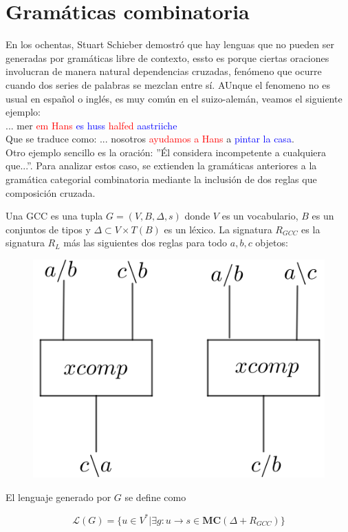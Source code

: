 \documentclass[../main.tex]{subfiles}
\begin{document}
	\section{Gramáticas combinatoria}
	
	En los ochentas, Stuart Schieber demostró que hay lenguas que no pueden ser generadas por gramáticas libre de contexto, essto es porque ciertas oraciones involucran de manera natural dependencias cruzadas, fenómeno que ocurre cuando dos series de palabras se mezclan entre sí. AUnque el fenomeno no es usual en español o inglés, es muy común en el suizo-alemán, veamos el siguiente ejemplo:\\
	... mer \textcolor{red}{em Hans} \textcolor{blue}{es huss} \textcolor{red}{halfed} \textcolor{blue}{aastriiche}\\
	Que se traduce como: ... nosotros \textcolor{red}{ayudamos a Hans} a \textcolor{blue}{pintar la casa}.\\
	Otro ejemplo sencillo es la oración: ''Él considera incompetente a cualquiera que...''.
	Para analizar estos caso, se extienden la gramáticas anteriores a la gramática categorial combinatoria mediante la inclusión de dos reglas que composición cruzada.
	
	\begin{dfn}
		Una GCC es una tupla $G=(V,B, \Delta, s)$ donde $V$ es un vocabulario, $B$ es un conjuntos de tipos y $\Delta \subset V \times T(B)$ es un léxico. La signatura $R_{GCC}$ es la signatura $R_{L}$ más las siguientes dos reglas para todo $a,b,c$ objetos:
		\begin{figure}[H]
			\includegraphics[scale=18]{diagrama/CCG.png}
			\centering
		\end{figure}
		El lenguaje generado por $G$ se define como
		
		$$\mathcal{L}(G)= \{ u \in V^*|\exists g:u \to s \in \textbf{MC}(\Delta + R_{GCC}) \}$$
	\end{dfn}
	
\end{document}
